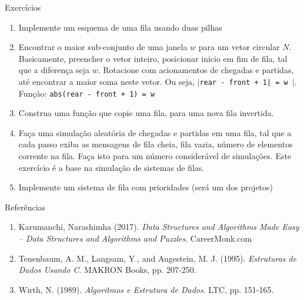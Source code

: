 \begin{frame}{Exercícios}
	
	\begin{enumerate}
	\item Implemente um esquema de uma fila usando duas pilhas
	
	\item Encontrar o maior sub-conjunto de uma janela $w$ para um vetor circular
	$N$. Basicamente, preencher o vetor inteiro, posicionar inicio em fim de fila,
	tal que a diferença seja $w$. Rotacione com acionamentos de 
	chegadas e partidas, até encontrar a maior soma neste vetor. Ou seja,
  \texttt{$\mid $rear - front + 1| = w $\mid $}. 
  Função: \texttt{abs(rear - front + 1) = w}
	 
	 
	\item Construa uma função que copie uma fila, para uma nova fila invertida.
	
	\item Faça uma simulação aleatória de chegadas e partidas em uma fila,
	tal que a cada passo exiba as mensagens de fila cheia, fila vazia,
	número de elementos corrente na fila. Faça isto para um número considerável
	de simulações. Este exercício é a base na simulação de sistemas de filas.
	
	\item Implemente um sistema de fila com prioridades (será um dos projetos)
	
	
	
	
	\end{enumerate}
	
\end{frame}





\begin{frame}{Referências}
	
	\begin{enumerate}
	
		\item Karumanchi, Narashimha (2017). 
		\textit{Data Structures and Algorithms Made Easy -- Data Structures and Algorithms
		and Puzzles}.  CareerMonk.com

		\item Tenenbaum, A. M., Langsam, Y., and Augestein, M. J. (1995). 
		\textit{Estruturas de Dados Usando C}. MAKRON Books, pp. 207-250.

		\item Wirth, N. (1989). \textit{Algoritmos e Estrutura de Dados}. 
		LTC, pp. 151-165.
	
	
	
	\end{enumerate}
	
\end{frame}
